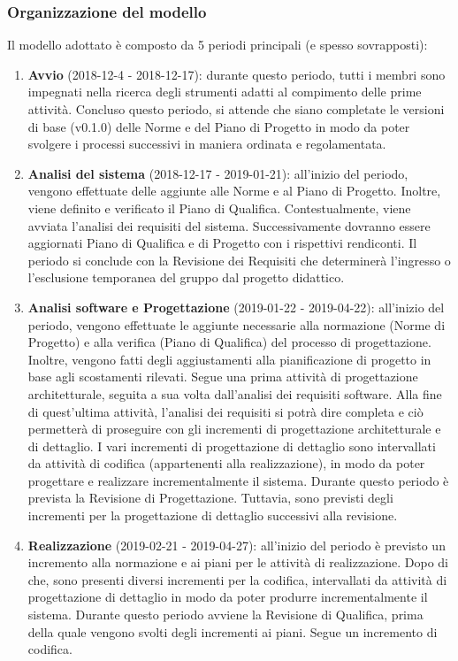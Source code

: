 \subsubsection{Organizzazione del modello}
Il modello adottato è composto da 5 periodi principali (e spesso sovrapposti):
\begin{enumerate}
	\item \textbf{Avvio} (2018-12-4 - 2018-12-17): durante questo periodo, tutti i membri sono impegnati nella ricerca degli strumenti adatti al compimento delle prime attività. Concluso questo periodo, si attende che siano completate le versioni di base (v0.1.0) delle Norme e del Piano di Progetto in modo da poter svolgere i processi successivi in maniera ordinata e regolamentata.
	\item \textbf{Analisi del sistema} (2018-12-17 - 2019-01-21): all'inizio del periodo, vengono effettuate delle aggiunte alle Norme e al Piano di Progetto. Inoltre, viene definito e verificato il Piano di Qualifica. Contestualmente, viene avviata l'analisi dei requisiti del sistema. Successivamente dovranno essere aggiornati Piano di Qualifica e di Progetto con i rispettivi rendiconti. Il periodo si conclude con la Revisione dei Requisiti che determinerà l'ingresso o l'esclusione temporanea del gruppo dal progetto didattico.
	\item \textbf{Analisi software e Progettazione} (2019-01-22 - 2019-04-22): all'inizio del periodo, vengono effettuate le aggiunte necessarie alla normazione (Norme di Progetto) e alla verifica (Piano di Qualifica) del processo di progettazione. Inoltre, vengono fatti degli aggiustamenti alla pianificazione di progetto in base agli scostamenti rilevati. Segue una prima attività di progettazione architetturale, seguita a sua volta dall'analisi dei requisiti software. Alla fine di quest'ultima attività, l'analisi dei requisiti si potrà dire completa e ciò permetterà di proseguire con gli incrementi di progettazione architetturale e di dettaglio. I vari incrementi di progettazione di dettaglio sono intervallati da attività di codifica (appartenenti alla realizzazione), in modo da poter progettare e realizzare incrementalmente il sistema. Durante questo periodo è prevista la Revisione di Progettazione. Tuttavia, sono previsti degli incrementi per la progettazione di dettaglio successivi alla revisione.
	\item \textbf{Realizzazione} (2019-02-21 - 2019-04-27): all'inizio del periodo è previsto un incremento alla normazione e ai piani per le attività di realizzazione. Dopo di che, sono presenti diversi incrementi per la codifica, intervallati da attività di progettazione di dettaglio in modo da poter produrre incrementalmente il sistema. Durante questo periodo avviene la Revisione di Qualifica, prima della quale vengono svolti degli incrementi ai piani. Segue un incremento di codifica.

\end{enumerate}
